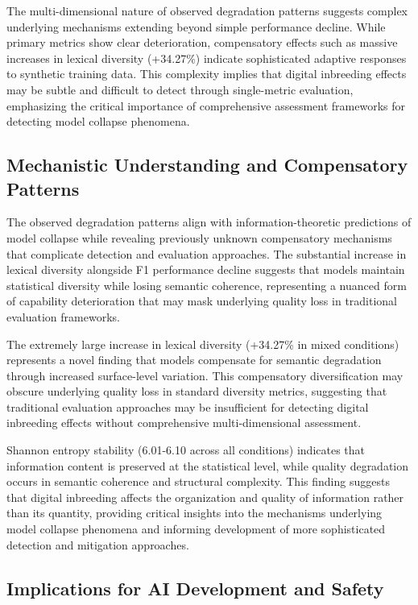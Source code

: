 \documentclass{article}
\begin{document}
The multi-dimensional nature of observed degradation patterns suggests complex underlying mechanisms extending beyond simple performance decline. While primary metrics show clear deterioration, compensatory effects such as massive increases in lexical diversity (+34.27\%) indicate sophisticated adaptive responses to synthetic training data. This complexity implies that digital inbreeding effects may be subtle and difficult to detect through single-metric evaluation, emphasizing the critical importance of comprehensive assessment frameworks for detecting model collapse phenomena.

\subsection{Mechanistic Understanding and Compensatory Patterns}

The observed degradation patterns align with information-theoretic predictions of model collapse while revealing previously unknown compensatory mechanisms that complicate detection and evaluation approaches. The substantial increase in lexical diversity alongside F1 performance decline suggests that models maintain statistical diversity while losing semantic coherence, representing a nuanced form of capability deterioration that may mask underlying quality loss in traditional evaluation frameworks.

The extremely large increase in lexical diversity (+34.27\% in mixed conditions) represents a novel finding that models compensate for semantic degradation through increased surface-level variation. This compensatory diversification may obscure underlying quality loss in standard diversity metrics, suggesting that traditional evaluation approaches may be insufficient for detecting digital inbreeding effects without comprehensive multi-dimensional assessment.

Shannon entropy stability (6.01-6.10 across all conditions) indicates that information content is preserved at the statistical level, while quality degradation occurs in semantic coherence and structural complexity. This finding suggests that digital inbreeding affects the organization and quality of information rather than its quantity, providing critical insights into the mechanisms underlying model collapse phenomena and informing development of more sophisticated detection and mitigation approaches.

\subsection{Implications for AI Development and Safety}
\end{document}
